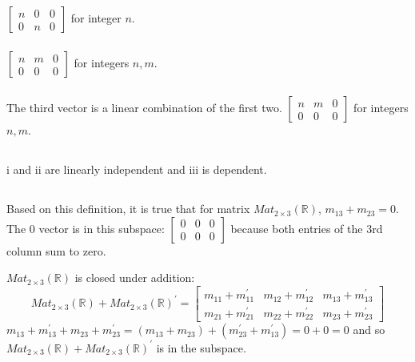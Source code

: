 \documentclass{article}
\begin{document}
\subsection{}
\subsubsection{}
$\left[\begin{array}{ccc}n&0&0\\0&n&0\end{array}\right]$ for integer $n$.
\subsubsection{}
$\left[\begin{array}{ccc}n&m&0\\0&0&0\end{array}\right]$ for integers $n,m$.
\subsubsection{}
The third vector is a linear combination of the first two.\newline
$\left[\begin{array}{ccc}n&m&0\\0&0&0\end{array}\right]$ for integers $n,m$.
\subsection{}
i and ii are linearly independent and iii is dependent.
\subsection{}
Based on this definition, it is true that for matrix $Mat_{2\times 3}(\mathbb{R})$, $m_{13} + m_{23} = 0$. \newline
The 0 vector is in this subspace: $\left[\begin{array}{ccc} 0&0&0\\0&0&0\end{array}\right]$ because both entries of the 3rd column sum to zero.\newline

$Mat_{2\times 3}(\mathbb{R})$ is closed under addition:
$$Mat_{2\times 3}(\mathbb{R}) + Mat_{2\times 3}(\mathbb{R})^{'} =\left[\begin{array}{ccc} m_{11}+m_{11}^{'} & m_{12}+m_{12}^{'} & m_{13}+m_{13}^{'} \\  m_{21}+m_{21}^{'} & m_{22}+m_{22}^{'} & m_{23}+m_{23}^{'}\end{array}\right] $$
$m_{13}+m_{13}^{'} + m_{23}+m_{23}^{'} = (m_{13}+m_{23}) + (m_{23}^{'}+m_{13}^{'}) = 0 + 0 = 0$ and so $Mat_{2\times 3}(\mathbb{R}) + Mat_{2\times 3}(\mathbb{R})^{'}$ is in the subspace.\newline
\end{document}
